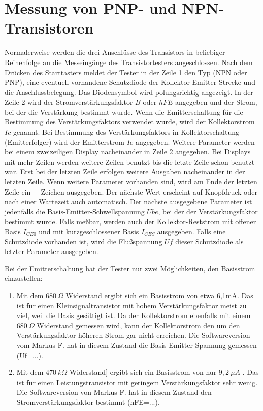 \section{Messung von PNP- und NPN-Transistoren}
Normalerweise werden die drei Anschlüsse des Transistors in beliebiger Reihenfolge an die Messeingänge des
Transistortesters angeschlossen.
Nach dem Drücken des Starttasters meldet der Tester in der Zeile 1 den Typ (NPN oder PNP), 
eine eventuell vorhandene Schutzdiode der Kollektor-Emitter-Strecke und
die Anschlussbelegung. Das Diodensymbol wird  polungsrichtig angezeigt.
In der Zeile 2 wird der Stromverstärkungsfaktor \(B\) oder \(hFE\) angegeben und der Strom, bei der die Verstärkung
bestimmt wurde. Wenn die Emitterschaltung für die Bestimmung des Verstärkungsfaktors verwendet wurde,
wird der Kollektorstrom \(Ic\) genannt. Bei Bestimmung des Verstärkungsfaktors in Kollektorschaltung (Emitterfolger)
wird der Emitterstrom \(Ie\) angegeben. Weitere Parameter werden bei einem zweizeiligen Display
nacheinander in Zeile 2 angegeben. Bei Displays mit mehr Zeilen werden weitere Zeilen benutzt bis
die letzte Zeile schon benutzt war.
Erst bei der letzten Zeile erfolgen weitere Ausgaben nacheinander in der letzten Zeile.
Wenn weitere Parameter vorhanden sind, wird am Ende der letzten Zeile ein + Zeichen ausgegeben.
Der nächste Wert erscheint auf Knopfdruck oder nach einer Wartezeit auch automatisch.
Der nächste ausgegebene Parameter ist jedenfalls die Basis-Emitter-Schwellspannung \(Ube\),
bei der der Verstärkungsfaktor bestimmt wurde.
Falls meßbar, werden auch der Kollektor-Reststrom mit offener Basis \(I_{CE0}\) und mit kurzgeschlossener
Basis \(I_{CES}\) ausgegeben.
Falls eine Schutzdiode vorhanden ist, wird die Flußspannung \(Uf\) dieser Schutzdiode als letzter Parameter ausgegeben.


Bei der Emitterschaltung hat der Tester nur zwei Möglichkeiten, den Basisstrom einzustellen:
\begin{enumerate}
\item Mit dem \(680~\Omega\) Widerstand ergibt sich ein Basisstrom von etwa 6,1mA. Das ist für einen
Kleinsignaltransistor mit hohem Verstärkungsfaktor meist zu viel, weil die Basis gesättigt ist.
Da der Kollektorstrom ebenfalls mit einem \(680~\Omega\) Widerstand gemessen wird, kann der Kollektorstrom
den um den Verstärkungsfaktor höheren Strom gar nicht erreichen. Die Softwareversion vom Markus F. hat
in diesem Zustand die Basis-Emitter Spannung gemessen (Uf=...).\\
\item Mit dem \(470~k\Omega\) Widerstand] ergibt sich ein Basisstrom von nur \(9,2~\mu A\) .
Das ist für einen Leistungstransistor mit geringem Verstärkungsfaktor sehr wenig.
Die Softwareversion von Markus F. hat in diesem Zustand den Stromverstärkungsfaktor bestimmt (hFE=...).\\
\end{enumerate}


